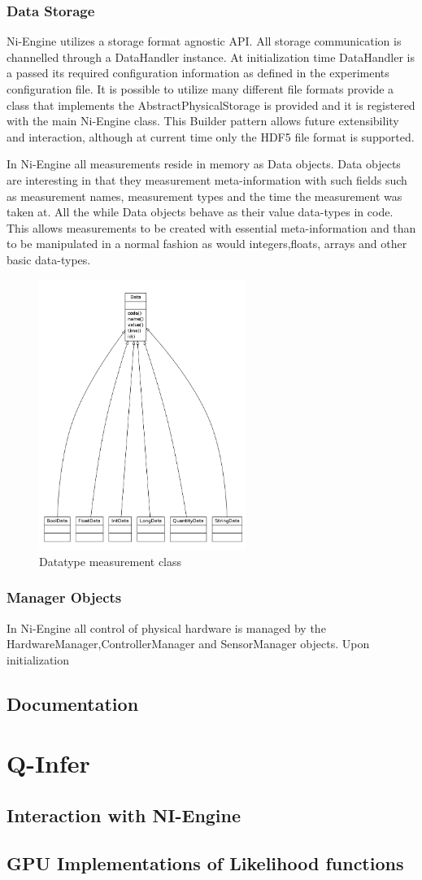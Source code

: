 \subsubsection{Data Storage}
Ni-Engine utilizes a storage format agnostic API. All storage communication is channelled through a DataHandler instance. At initialization time DataHandler is a passed its required configuration information as defined in the experiments configuration file. It is possible to utilize many different file formats provide a class that implements the AbstractPhysicalStorage is provided and it is registered with the main Ni-Engine class. This Builder pattern allows future extensibility and interaction, although at current time only the HDF5 file format is supported. 

In Ni-Engine all measurements reside in memory as Data objects. Data objects are interesting in that they measurement meta-information with such fields such as measurement names, measurement types and the time the measurement was taken at. All the while Data objects behave as their value data-types in code. This allows measurements to be created with essential meta-information and than to be manipulated in a normal fashion as would integers,floats, arrays and other basic data-types. 
\begin{figure}[ht!]
\centering
\includegraphics[width=0.6\textwidth]{Figures/datatypes.png}
\caption{Datatype measurement class}
\label{fig:datatypes}
\end{figure}
\subsubsection{Manager Objects}
In Ni-Engine all control of physical hardware is managed by the HardwareManager,ControllerManager and SensorManager objects. Upon initialization
\subsection{Documentation}
\section{Q-Infer}
\subsection{Interaction with NI-Engine}
\subsection{GPU Implementations of Likelihood functions}

